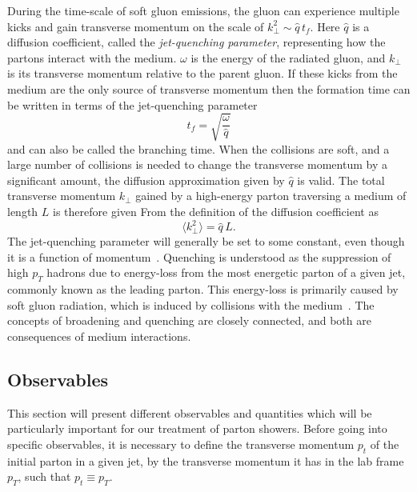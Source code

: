 \documentclass[main.tex]{subfiles}
\begin{document}
During the time-scale of soft gluon emissions, the gluon can experience multiple kicks and gain transverse momentum on the scale of \(k_\perp^2 \sim \hat q \,t_f\). Here \(\hat q\) is a diffusion coefficient, called the \emph{jet-quenching parameter}, representing how the partons interact with the medium. \(\omega\) is the energy of the radiated gluon, and \(k_\perp\) is its transverse momentum relative to the parent gluon. If these kicks from the medium are the only source of transverse momentum then the formation time can be written in terms of the jet-quenching parameter
\begin{equation}\label{eqn: branching_time}
    t_f = \sqrt{\frac{\omega}{\hat q}}
\end{equation}
and can also be called the branching time. When the collisions are soft, and a large number of collisions is needed to change the transverse momentum by a significant amount, the diffusion approximation given by \(\hat q\) is valid. The total transverse momentum \(k_\perp\) gained by a high-energy parton traversing a medium of length \(L\) is therefore given From the definition of the diffusion coefficient as
\begin{equation}\label{eqn: broadening}
    \langle k_\perp^2\rangle = \hat{q}\, L.
\end{equation}
The jet-quenching parameter will generally be set to some constant, even though it is a function of momentum~\cite{Jet_Structure_HeavyIonCollisions}. Quenching is understood as the suppression of high \(p_T\) hadrons due to energy-loss from the most energetic parton of a given jet, commonly known as the leading parton. This energy-loss is primarily caused by soft gluon radiation, which is induced by collisions with the medium~\cite{medium_induced_gluon_branching}. The concepts of broadening and quenching are closely connected, and both are consequences of medium interactions.

\subsection{Observables}
This section will present different observables and quantities which will be particularly important for our treatment of parton showers. Before going into specific observables, it is necessary to define the transverse momentum \(p_t\) of the initial parton in a given jet, by the transverse momentum it has in the lab frame \(p_T\), such that \(p_t \equiv p_T\).
\end{document}
